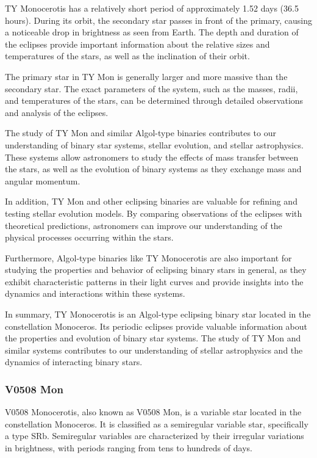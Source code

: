 TY Monocerotis has a relatively short period of approximately 1.52 days (36.5 hours). During its orbit, the secondary star passes in front of the primary, causing a noticeable drop in brightness as seen from Earth. The depth and duration of the eclipses provide important information about the relative sizes and temperatures of the stars, as well as the inclination of their orbit.

The primary star in TY Mon is generally larger and more massive than the secondary star. The exact parameters of the system, such as the masses, radii, and temperatures of the stars, can be determined through detailed observations and analysis of the eclipses.

The study of TY Mon and similar Algol-type binaries contributes to our understanding of binary star systems, stellar evolution, and stellar astrophysics. These systems allow astronomers to study the effects of mass transfer between the stars, as well as the evolution of binary systems as they exchange mass and angular momentum.

In addition, TY Mon and other eclipsing binaries are valuable for refining and testing stellar evolution models. By comparing observations of the eclipses with theoretical predictions, astronomers can improve our understanding of the physical processes occurring within the stars.

Furthermore, Algol-type binaries like TY Monocerotis are also important for studying the properties and behavior of eclipsing binary stars in general, as they exhibit characteristic patterns in their light curves and provide insights into the dynamics and interactions within these systems.

In summary, TY Monocerotis is an Algol-type eclipsing binary star located in the constellation Monoceros. Its periodic eclipses provide valuable information about the properties and evolution of binary star systems. The study of TY Mon and similar systems contributes to our understanding of stellar astrophysics and the dynamics of interacting binary stars.


\subsubsection*{ V0508 Mon }
V0508 Monocerotis, also known as V0508 Mon, is a variable star located in the constellation Monoceros. It is classified as a semiregular variable star, specifically a type SRb. Semiregular variables are characterized by their irregular variations in brightness, with periods ranging from tens to hundreds of days.

